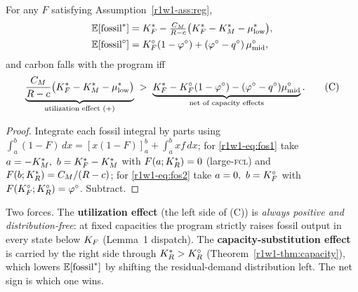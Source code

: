\begin{proposition}\label{r1w1-prop:carbon}
For any $F$ satisfying Assumption~\ref{r1w1-ass:reg},
\begin{align}
  \mathbb{E}[\text{fossil}^{*}] &=K_F^{*}-\tfrac{C_M}{R-c}\big(K_F^{*}-K_M^{*}-\mu^{*}_{\mathrm{low}}\big),
  \label{r1w1-eq:fos1}\\
  \mathbb{E}[\text{fossil}^{\circ}] &=K_F^{\circ}(1-\varphi^{\circ})+(\varphi^{\circ}-q^{\circ})\,\mu^{\circ}_{\mathrm{mid}},
  \label{r1w1-eq:fos2}
\end{align}
and carbon falls with the program iff
\begin{equation}\label{r1w1-eq:C}
  \underbrace{\frac{C_M}{R-c}\big(K_F^{*}-K_M^{*}-\mu^{*}_{\mathrm{low}}\big)}_{\text{utilization effect }(+)}
  \;>\;
  \underbrace{K_F^{*}-K_F^{\circ}(1-\varphi^{\circ})-(\varphi^{\circ}-q^{\circ})\mu^{\circ}_{\mathrm{mid}}}_{\text{net of capacity effects}}.
  \tag{C}
\end{equation}
\end{proposition}

\begin{proof}
Integrate each fossil integral by parts using
$\int_a^b(1-F)\,dx=[x(1-F)]_a^b+\int_a^b x f\,dx$; for \eqref{r1w1-eq:fos1} take
$a=-K_M^{*},\ b=K_F^{*}-K_M^{*}$ with $F(a;K_R^{*})=0$ (large-\textsc{fcl}) and
$F(b;K_R^{*})=C_M/(R-c)$; for \eqref{r1w1-eq:fos2} take $a=0,\ b=K_F^{\circ}$ with
$F(K_F^{\circ};K_R^{\circ})=\varphi^{\circ}$. Subtract.
\end{proof}

Two forces. The \textbf{utilization effect} (the left side of (C)) is
\emph{always positive and distribution-free}: at fixed capacities the program
strictly raises fossil output in every state below $K_F$ (Lemma~1 dispatch).
The \textbf{capacity-substitution effect} is carried by the right side through
$K_R^{*}>K_R^{\circ}$ (Theorem~\ref{r1w1-thm:capacity}), which lowers $\mathbb{E}[\text{fossil}^{*}]$ by
shifting the residual-demand distribution left. The net sign is which one wins.

